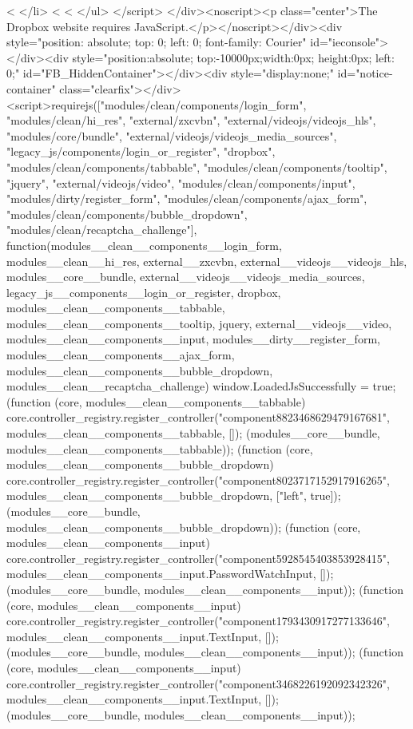 {          <%
        </li>
      <%
  <%
    </ul>
</script>
</div><noscript><p class="center">The Dropbox website requires JavaScript.</p></noscript></div><div style="position: absolute; top: 0; left: 0; font-family: Courier" id="ieconsole"></div><div style="position:absolute; top:-10000px;width:0px; height:0px; left: 0;" id="FB_HiddenContainer"></div><div style="display:none;" id="notice-container" class="clearfix"></div><script>requirejs(["modules/clean/components/login_form", "modules/clean/hi_res", "external/zxcvbn", "external/videojs/videojs_hls", "modules/core/bundle", "external/videojs/videojs_media_sources", "legacy_js/components/login_or_register", "dropbox", "modules/clean/components/tabbable", "modules/clean/components/tooltip", "jquery", "external/videojs/video", "modules/clean/components/input", "modules/dirty/register_form", "modules/clean/components/ajax_form", "modules/clean/components/bubble_dropdown", "modules/clean/recaptcha_challenge"], function(modules__clean__components__login_form, modules__clean__hi_res, external__zxcvbn, external__videojs__videojs_hls, modules__core__bundle, external__videojs__videojs_media_sources, legacy_js__components__login_or_register, dropbox, modules__clean__components__tabbable, modules__clean__components__tooltip, jquery, external__videojs__video, modules__clean__components__input, modules__dirty__register_form, modules__clean__components__ajax_form, modules__clean__components__bubble_dropdown, modules__clean__recaptcha_challenge) { window.LoadedJsSuccessfully = true;
(function (core, modules__clean__components__tabbable) { core.controller_registry.register_controller("component8823468629479167681", modules__clean__components__tabbable, []); }(modules__core__bundle, modules__clean__components__tabbable));
(function (core, modules__clean__components__bubble_dropdown) { core.controller_registry.register_controller("component8023717152917916265", modules__clean__components__bubble_dropdown, ["left", true]); }(modules__core__bundle, modules__clean__components__bubble_dropdown));
(function (core, modules__clean__components__input) { core.controller_registry.register_controller("component5928545403853928415", modules__clean__components__input.PasswordWatchInput, []); }(modules__core__bundle, modules__clean__components__input));
(function (core, modules__clean__components__input) { core.controller_registry.register_controller("component1793430917277133646", modules__clean__components__input.TextInput, []); }(modules__core__bundle, modules__clean__components__input));
(function (core, modules__clean__components__input) { core.controller_registry.register_controller("component3468226192092342326", modules__clean__components__input.TextInput, []); }(modules__core__bundle, modules__clean__components__input));
}}

